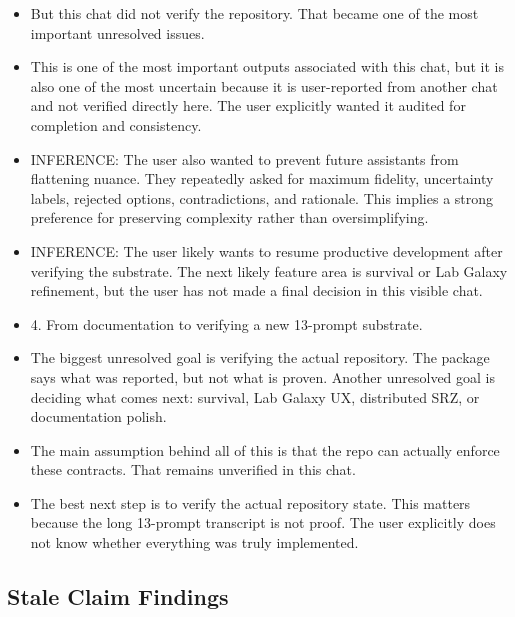 \documentclass[11pt,a4paper]{report}
\begin{document}
\begin{itemize}
\item But this chat did not verify the repository. That became one of the most important unresolved issues.
\item This is one of the most important outputs associated with this chat, but it is also one of the most uncertain because it is user-reported from another chat and not verified directly here. The user explicitly wanted it audited for completion and consistency.
\item INFERENCE: The user also wanted to prevent future assistants from flattening nuance. They repeatedly asked for maximum fidelity, uncertainty labels, rejected options, contradictions, and rationale. This implies a strong preference for preserving complexity rather than oversimplifying.
\item INFERENCE: The user likely wants to resume productive development after verifying the substrate. The next likely feature area is survival or Lab Galaxy refinement, but the user has not made a final decision in this visible chat.
\item 4. From documentation to verifying a new 13-prompt substrate.
\item The biggest unresolved goal is verifying the actual repository. The package says what was reported, but not what is proven. Another unresolved goal is deciding what comes next: survival, Lab Galaxy UX, distributed SRZ, or documentation polish.
\item The main assumption behind all of this is that the repo can actually enforce these contracts. That remains unverified in this chat.
\item The best next step is to verify the actual repository state. This matters because the long 13-prompt transcript is not proof. The user explicitly does not know whether everything was truly implemented.
\end{itemize}

\subsection{Stale Claim Findings}
\end{document}
